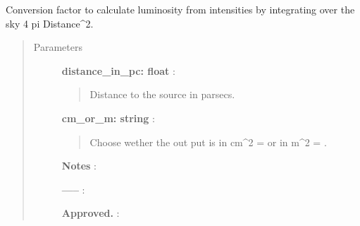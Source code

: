 \documentclass[a4paper,10pt,english]{sphinxmanual}
\begin{document}
\begin{fulllineitems}
\label{functions:astrolyze.functions.units.Int2Lum}
Conversion factor to calculate luminosity from intensities
by integrating over the sky 4 pi Distance\textasciicircum{}2.
\begin{quote}\begin{description}
\item[{Parameters }] \leavevmode
\textbf{distance\_in\_pc: float} :
\begin{quote}

Distance to the source in parsecs.
\end{quote}

\textbf{cm\_or\_m: string} :
\begin{quote}

Choose wether the out put is in cm\textasciicircum{}2 =  or in
m\textasciicircum{}2 = .
\end{quote}

\textbf{Notes} :

\textbf{-----} :

\textbf{Approved.} :

\end{description}\end{quote}

\end{fulllineitems}

\end{document}
